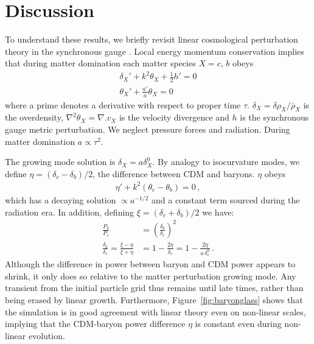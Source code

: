 \documentclass[a4paper,11pt]{article}
\begin{document}

\section{Discussion}
\label{sec:explanation}

To understand these results, we briefly revisit linear cosmological perturbation theory in the synchronous gauge \cite{Ma:1995}. Local energy momentum conservation implies that during matter domination each matter species $X = c$, $b$ obeys
\begin{align}
 \delta_X' + k^2 \theta_X + \frac{1}{2} h' = 0 \\
 \theta_X' + \frac{a'}{a} \theta_X = 0
\end{align}
where a prime denotes a derivative with respect to proper time $\tau$. $\delta_X = \delta \rho_X / \bar{\rho}_X$ is the overdensity, $\nabla^2 \theta_X = \nabla. v_X $ is the velocity divergence and $h$ is the synchronous gauge metric perturbation. We neglect pressure forces and radiation. During matter domination $a \propto \tau^2$.

The growing mode solution is $\delta_X = a \delta_X^0$. By analogy to isocurvature modes, we define $\eta = (\delta_c - \delta_b)/2$, the difference between CDM and baryons. $\eta$ obeys
\begin{align}
 \eta' + k^2 (\theta_c - \theta_b) = 0\,,
\end{align}
which has a decaying solution $\propto a^{-1/2}$ and a constant term sourced during the radiation era. In addition, defining $\xi = (\delta_c + \delta_b) / 2$ we have:
\begin{align}
 \frac{P_b} {P_c} &= \left(\frac{\delta_b} {\delta_c}\right)^2 \\
\frac{\delta_b} {\delta_c} = \frac{\xi - \eta} {\xi + \eta} & = 1 - \frac{ 2 \eta} {\delta_c} = 1 - \frac{ 2 \eta} {a \,\delta_c^0}\,.
\end{align}
Although the difference in power between baryon and CDM power appears to shrink, it only does so relative to the matter perturbation growing mode. Any transient from the initial particle grid thus remains until late times, rather than being erased by linear growth. Furthermore, Figure~\ref{fig:baryonglass} shows that the simulation is in good agreement with linear theory even on non-linear scales, implying that the CDM-baryon power difference $\eta$ is constant even during non-linear evolution.
\end{document}
